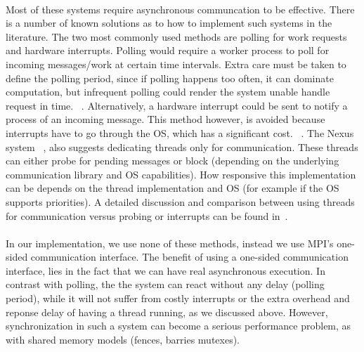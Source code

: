 \paragraph{}
Most of these systems require asynchronous communcation to be effective.  There is a number of known solutions as 
to how to implement such systems in the literature.  The two most commonly used methods are polling for work requests
~\cite{Beckman96tulip:a, Saunders:2003:AAP:966049.781534, Foster96thenexus, vonEicken:1992:AMM:146628.140382} 
and hardware interrupts.
Polling would require a worker process to poll for incoming messages/work at certain
time intervals.   Extra care must be taken to define the polling period, since if polling happens too often, it can
dominate computation, but infrequent polling could render the system unable handle request in time. 
~\cite{Saunders:2003:AAP:966049.781534, Shah:1998:PEL:876880.879642}.
Alternatively, a hardware interrupt could be sent to notify a process of an incoming message.  This method however,
is avoided because interrupts have to go through the OS, which has a significant cost. 
~\cite{Saunders:2003:AAP:966049.781534, Shah:1998:PEL:876880.879642, Foster96thenexus, vonEicken:1992:AMM:146628.140382}.
The Nexus system ~\cite{Foster96thenexus}, also suggests dedicating threads only for communication.  These threads can 
either probe for pending messages or block (depending on the underlying communication library and OS capabilities).
How responsive this implementation can be depends on the thread implementation and OS (for example if the OS supports
priorities).  A detailed discussion and comparison between using threads for communication versus probing or interrupts
can be found in~\cite{Foster96thenexus}.

\paragraph{}
In our implementation, we use none of these methods, instead we use MPI's one-sided communication interface.  The benefit
of using a one-sided communication interface, lies in the fact that we can have real asynchronous execution.  In contrast 
with polling, the the system can react without any delay (polling period), while it will not suffer from costly interrupts
or the extra overhead and reponse delay of having a thread running, as we discussed above.  However, synchronization in such
a system can become a serious performance problem, as with shared memory models (fences, barries mutexes).




